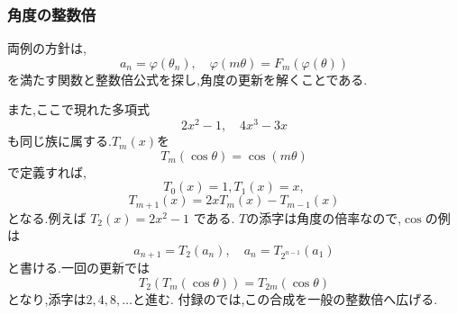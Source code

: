   \subsubsection{角度の整数倍}\label{節：整数倍の公式へ}
    両例の方針は,
    \[
      a_n=\varphi(\theta_n),
      \quad
      \varphi(m\theta)=F_m(\varphi(\theta))
    \]
    を満たす関数と整数倍公式を探し,角度の更新を解くことである.

    また,ここで現れた多項式
    \[
      2x^2-1,
      \quad
      4x^3-3x
    \]
    も同じ族に属する.$T_m(x)$を
    \[
      T_m(\cos\theta)=\cos(m\theta)
    \]
    で定義すれば,
    \[
      T_0(x)=1,  T_1(x)=x,
    \]
    \[
      T_{m+1}(x)=2xT_m(x)-T_{m-1}(x)
    \]
    となる.例えば $T_2(x)=2x^2-1$ である.
    $T$の添字は角度の倍率なので,$\cos$の例は
    \[
      a_{n+1}=T_2(a_n),
      \quad
      a_n=T_{2^{n-1}}(a_1)
    \]
    と書ける.一回の更新では
    \[
      T_2(T_m(\cos\theta))=T_{2m}(\cos\theta)
    \]
    となり,添字は$2,4,8,\ldots$と進む.
    付録のでは,この合成を一般の整数倍へ広げる.
